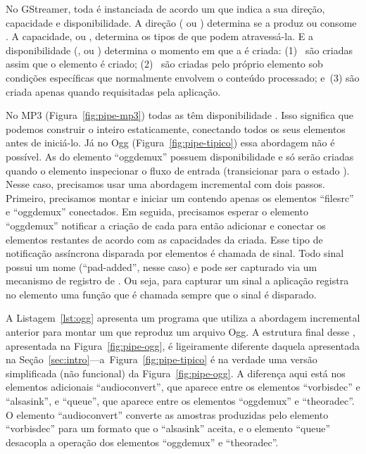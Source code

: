 \documentclass{SBCbookchapter}
\begin{document}
No GStreamer, toda  é instanciada de acordo um  que
indica a sua direção, capacidade e disponibilidade.  A direção (
ou ) determina se a  produz ou consome .
A capacidade, ou , determina os tipos de  que podem
atravessá-la.  E a disponibilidade (,  ou
) determina o momento em que a  é criada: (1)~ são criadas assim que o elemento é criado; (2)~
são criadas pelo próprio elemento sob condições específicas que normalmente
envolvem o conteúdo processado; e~(3) são criada apenas
quando requisitadas pela aplicação.

No  MP3 (Figura~\ref{fig:pipe-mp3}) todas as  têm
disponibilidade .  Isso significa que podemos construir o
 inteiro estaticamente, conectando todos os seus elementos
antes de iniciá-lo.  Já no  Ogg (Figura~\ref{fig:pipe-tipico})
essa abordagem não é possível.  As  do elemento ``oggdemux''
possuem disponibilidade  e só serão criadas quando o elemento
inspecionar o fluxo de entrada (transicionar para o estado ).
Nesse caso, precisamos usar uma abordagem incremental com dois passos.
Primeiro, precisamos montar e iniciar um  contendo apenas os
elementos ``filesrc'' e ``oggdemux'' conectados.  Em seguida, precisamos
esperar o elemento ``oggdemux'' notificar a criação de cada 
para então adicionar e conectar os elementos restantes de acordo com as
capacidades da  criada.  Esse tipo de notificação assíncrona
disparada por elementos é chamada de sinal.  Todo sinal possui um nome
(``pad-added'', nesse caso) e pode ser capturado via um mecanismo de
registro de .  Ou seja, para capturar um sinal a aplicação
registra no elemento uma função  que é chamada sempre que o
sinal é disparado.

A Listagem~\ref{lst:ogg} apresenta um programa que utiliza a abordagem
incremental anterior para montar um  que reproduz um arquivo
Ogg.  A estrutura final desse , apresentada na
Figura~\ref{fig:pipe-ogg}, é ligeiramente diferente daquela apresentada na
Seção~\ref{sec:intro}---a~Figura~\ref{fig:pipe-tipico} é na verdade uma
versão simplificada (não funcional) da Figura~\ref{fig:pipe-ogg}.
A diferença aqui está nos elementos adicionais ``audioconvert'', que aparece
entre os elementos ``vorbisdec'' e ``alsasink'', e ``queue'', que aparece
entre os elementos ``oggdemux'' e ``theoradec''.  O elemento
``audioconvert'' converte as amostras produzidas pelo elemento ``vorbisdec''
para um formato que o ``alsasink'' aceita, e o elemento ``queue'' desacopla
a operação dos elementos ``oggdemux'' e ``theoradec''.
\end{document}
